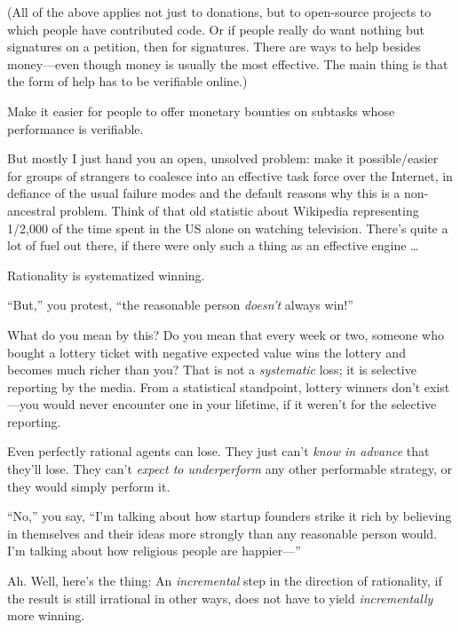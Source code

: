 {
 (All of the above applies not just to donations, but to
open-source projects to which people have contributed code. Or if
people really do want nothing but signatures on a petition, then for
signatures. There are ways to help besides money---even though money is
usually the most effective. The main thing is that the form of help has
to be verifiable online.)}

{
 Make it easier for people to offer monetary bounties on subtasks
whose performance is verifiable.}

{
 But mostly I just hand you an open, unsolved problem: make it
possible/easier for groups of strangers to coalesce into an effective
task force over the Internet, in defiance of the usual failure modes
and the default reasons why this is a non-ancestral problem. Think of
that old statistic about Wikipedia representing 1/2,000 of the time
spent in the US alone on watching television. There's
quite a lot of fuel out there, if there were only such a thing as an
effective engine \ldots}

\myendsectiontext


{
 Rationality is systematized winning. }

{
 ``But,'' you protest,
``the reasonable person
\textit{doesn't} always win!''}

{
 What do you mean by this? Do you mean that every week or two,
someone who bought a lottery ticket with negative expected value wins
the lottery and becomes much richer than you? That is not a
\textit{systematic} loss; it is selective reporting by the media. From
a statistical standpoint, lottery winners don't
exist---you would never encounter one in your lifetime, if it
weren't for the selective reporting.}

{
 Even perfectly rational agents can lose. They just
can't \textit{know in advance} that
they'll lose. They can't \textit{expect
to underperform} any other performable strategy, or they would simply
perform it.}

{
 ``No,'' you say,
``I'm talking about how startup
founders strike it rich by believing in themselves and their ideas more
strongly than any reasonable person would. I'm talking
about how religious people are happier---''}

{
 Ah. Well, here's the thing: An
\textit{incremental} step in the direction of rationality, if the
result is still irrational in other ways, does not have to yield
\textit{incrementally} more winning.}

